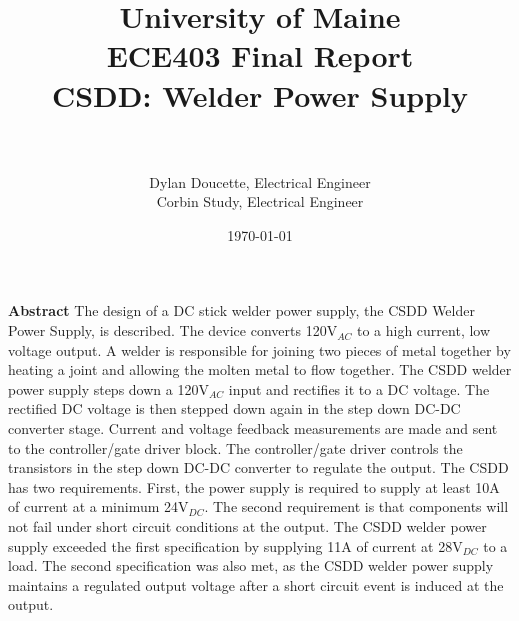 \documentclass[11pt]{article}
\begin{document}


\title{{\huge University of Maine} \\
{\large ECE403 Final Report}\\
\textbf{CSDD: Welder Power Supply\\}\\
     }
\author{Dylan Doucette, Electrical Engineer\\Corbin Study, Electrical Engineer 
  	}
\date{\today}
\maketitle


\newpage %
\textbf{Abstract}
\newline
The design of a DC stick welder power supply, the CSDD Welder Power Supply, is described. The device converts 120V$_{AC}$ to a high current, low voltage output. A welder is responsible for joining two pieces of metal together by heating a joint and allowing the molten metal to flow together. The CSDD welder power supply steps down a 120V$_{AC}$ input and rectifies it to a DC voltage. The rectified DC voltage is then stepped down again in the step down DC-DC converter stage. Current and voltage feedback measurements are made and sent to the controller/gate driver block. The controller/gate driver controls the transistors in the step down DC-DC converter to regulate the output. The CSDD has two requirements. First, the power supply is required to supply at least 10A of current at a minimum 24V$_{DC}$. The second requirement is that components will not fail under short circuit conditions at the output. The CSDD welder power supply exceeded the first specification by supplying 11A of current at 28V$_{DC}$ to a load. The second specification was also met, as the CSDD welder power supply maintains a regulated output voltage after a short circuit event is induced at the output.

\end{document}
